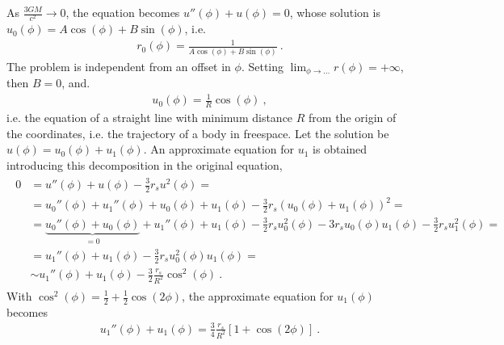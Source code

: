 \documentclass[letterpaper,10pt,english]{jupyterBook}
\begin{document}
\sphinxAtStartPar
{} As \(\frac{3 GM}{c^2} \to 0\), the equation becomes \(u''(\phi) + u(\phi) = 0\), whose solution is \(u_0(\phi) = A \cos(\phi) + B\sin(\phi)\), i.e.
\begin{equation*}
\begin{split}r_{0}(\phi) = \frac{1}{A \cos(\phi) + B \sin(\phi)} \ .\end{split}
\end{equation*}
\sphinxAtStartPar
The problem is independent from an offset in \(\phi\). Setting \(\lim_{\phi \to \dots} r(\phi) = +\infty\), then \(B = 0\), and.   
\begin{equation*}
\begin{split}u_0(\phi) = \frac{1}{R} \cos(\phi) \ ,\end{split}
\end{equation*}
\sphinxAtStartPar
i.e. the equation of a straight line with minimum distance \(R\) from the origin of the coordinates, i.e. the trajectory of a body in free\sphinxhyphen{}space. Let the solution be \(u(\phi) = u_0(\phi) + u_1(\phi)\). An approximate equation for \(u_1\) is obtained introducing this decomposition in the original equation,
\begin{equation*}
\begin{split}\begin{aligned}
0
& = u''(\phi) + u(\phi) - \frac{3}{2} r_{s} u^2(\phi) = \\
& = u_0''(\phi) + u_1''(\phi) + u_0(\phi) + u_1(\phi) - \frac{3}{2} r_{s} (u_0(\phi) + u_1(\phi) )^2 = \\
& = \underbrace{ u_0''(\phi) + u_0(\phi) }_{ = 0 } + u_1''(\phi) + u_1(\phi) - \frac{3}{2} r_{s} u_0^2(\phi) - 3 r_{s} u_0(\phi) u_1(\phi) - \frac{3}{2} r_{s} u_1^2(\phi) = \\
& = u_1''(\phi) + u_1(\phi) - \frac{3}{2} r_s u_0^2(\phi) u_1(\phi) = \\ 
& \sim u_1''(\phi) + u_1(\phi) - \frac{3}{2} \frac{r_s}{R^2} \cos^2(\phi) \ .
\end{aligned}\end{split}
\end{equation*}
\sphinxAtStartPar
With \(\cos^2(\phi) = \frac{1}{2} + \frac{1}{2} \cos(2 \phi)\), the approximate equation for \(u_1(\phi)\) becomes
\begin{equation*}
\begin{split}
  u_1''(\phi) + u_1(\phi) = \frac{3}{4} \frac{r_s}{R^2} \left[ 1 + \cos(2 \phi) \right] \ .
\end{split}
\end{equation*}
\end{document}
